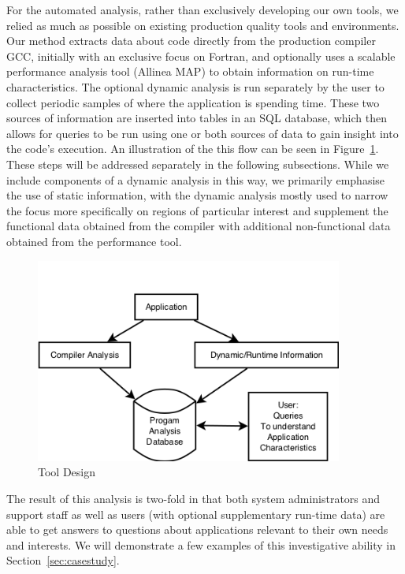 For the automated analysis, rather than exclusively developing our own tools, we relied as much as possible on existing production quality tools and environments.
Our method extracts data about code directly from the production compiler \acs{GCC}, initially with an exclusive focus on Fortran, and optionally uses a scalable performance analysis tool (Allinea MAP) to obtain information on run-time characteristics.
The optional dynamic analysis is run separately by the user to collect periodic samples of where the application is spending time.
These two sources of information are inserted into tables in an \acs{SQL} database, which then allows for queries to be run using one or both sources of data to gain insight into the code's execution.
An illustration of the this flow can be seen in Figure~\ref{fig:design}.
These steps will be addressed separately in the following subsections.
While we include components of a dynamic analysis in this way, we primarily emphasise the use of static information, with the dynamic analysis mostly used to narrow the focus more specifically on regions of particular interest and supplement the functional data obtained from the compiler with additional non-functional data obtained from the performance tool.

\begin{figure}
\begin{center}
\includegraphics[width=0.9\textwidth]{images/design.png}
\end{center}
\caption{Tool Design}
\label{fig:design}
\end{figure}

The result of this analysis is two-fold in that both system administrators and support staff as well as users (with optional supplementary run-time data) are able to get answers to questions about applications relevant to their own needs and interests.
We will demonstrate a few examples of this investigative ability in Section~\ref{sec:casestudy}.

